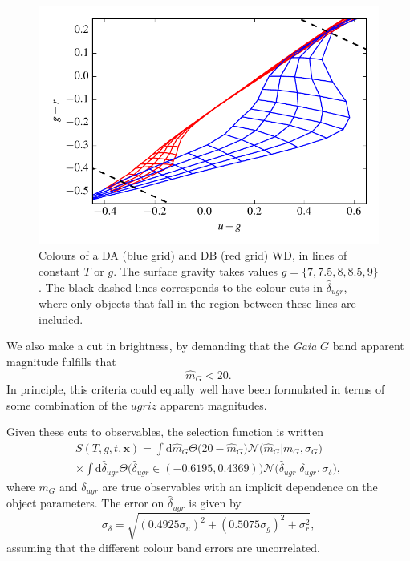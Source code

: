 \documentclass[fleqn,usenatbib]{mnras}
\newcommand{\Teff}{T}
\newcommand{\logg}{g}
\newcommand{\de}{\text{d}}
\begin{document}
\begin{figure}
	\includegraphics[width=\columnwidth]{colors_cut.pdf}
    \caption{Colours of a DA (blue grid) and DB (red grid) WD, in lines of constant $\Teff$ or $\logg$. The surface gravity takes values $\logg = \{7,7.5,8,8.5,9\}$. The black dashed lines corresponds to the colour cuts in $\hat{\delta}_{ugr}$, where only objects that fall in the region between these lines are included.}
    \label{fig:colors_cut}
\end{figure}

We also make a cut in brightness, by demanding that the \emph{Gaia} $G$ band apparent magnitude fulfills that
\begin{equation}
	\hat{m}_G < 20.
\end{equation}
In principle, this criteria could equally well have been formulated in terms of some combination of the $ugriz$ apparent magnitudes.

Given these cuts to observables, the selection function is written
\begin{equation}\label{eq:selection}
\begin{split}
	S(\Teff,\logg,t,\mathbf{x}) = 
    	      \int \de \hat{m}_G \Theta \big( 20-\hat{m}_G \big)\mathcal{N}\big( \hat{m}_G | m_G,\sigma_G \big) \\
    \times \int \de \hat{\delta}_{ugr} \Theta \big( \hat{\delta}_{ugr} \in (-0.6195,0.4369) \big) \mathcal{N}\big( \hat{\delta}_{ugr} | \delta_{ugr},\sigma_{\delta}\big),
\end{split}
\end{equation}
where $m_G$ and $\delta_{ugr}$ are true observables with an implicit dependence on the object parameters. The error on $\hat{\delta}_{ugr}$ is given by
\begin{equation}
	\sigma_\delta = \sqrt{ (0.4925 \sigma_u)^2 + (0.5075 \sigma_g)^2 + \sigma_r^2 },
\end{equation}
assuming that the different colour band errors are uncorrelated.
\end{document}
